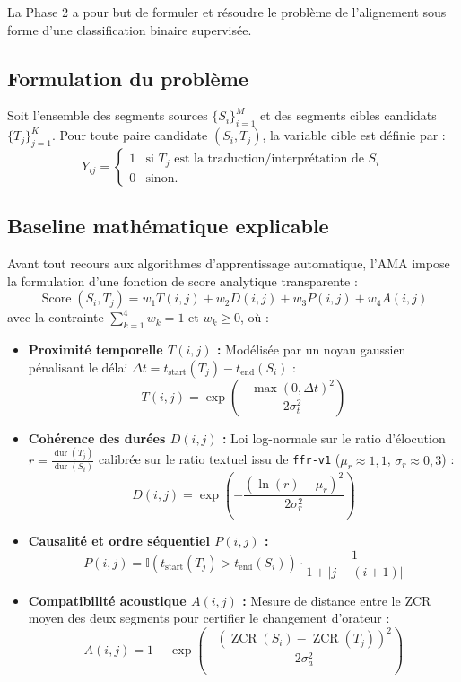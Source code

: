 \documentclass[10pt,a4paper,twocolumn]{article}
\begin{document}
La Phase 2 a pour but de formuler et résoudre le problème de l'alignement sous forme d'une classification binaire supervisée.

\subsection{Formulation du problème}
Soit l'ensemble des segments sources $\{S_i\}_{i=1}^{M}$ et des segments cibles candidats $\{T_j\}_{j=1}^{K}$. Pour toute paire candidate $(S_i, T_j)$, la variable cible est définie par :
\begin{equation}
Y_{ij} = \begin{cases} 
1 & \text{si } T_j \text{ est la traduction/interprétation de } S_i \\
0 & \text{sinon.}
\end{cases}
\end{equation}

\subsection{Baseline mathématique explicable}
Avant tout recours aux algorithmes d'apprentissage automatique, l'AMA impose la formulation d'une fonction de score analytique transparente :
\begin{equation}
\operatorname{Score}(S_i, T_j) = w_1 T(i, j) + w_2 D(i, j) + w_3 P(i, j) + w_4 A(i, j)
\end{equation}
avec la contrainte $\sum_{k=1}^4 w_k = 1$ et $w_k \ge 0$, où :
\begin{itemize}
    \item \textbf{Proximité temporelle $T(i, j)$ :} Modélisée par un noyau gaussien pénalisant le délai $\Delta t = t_{\text{start}}(T_j) - t_{\text{end}}(S_i)$ :
    \begin{equation}
    T(i, j) = \exp\left( - \frac{\max(0, \Delta t)^2}{2 \sigma_t^2} \right)
    \end{equation}
    \item \textbf{Cohérence des durées $D(i, j)$ :} Loi log-normale sur le ratio d'élocution $r = \frac{\operatorname{dur}(T_j)}{\operatorname{dur}(S_i)}$ calibrée sur le ratio textuel issu de \texttt{ffr-v1} ($\mu_r \approx 1{,}1$, $\sigma_r \approx 0{,}3$) :
    \begin{equation}
    D(i, j) = \exp\left( - \frac{(\ln(r) - \mu_r)^2}{2 \sigma_r^2} \right)
    \end{equation}
    \item \textbf{Causalité et ordre séquentiel $P(i, j)$ :}
    \begin{equation}
    P(i, j) = \mathbb{I}(t_{\text{start}}(T_j) > t_{\text{end}}(S_i)) \cdot \frac{1}{1 + |j - (i + 1)|}
    \end{equation}
    \item \textbf{Compatibilité acoustique $A(i, j)$ :} Mesure de distance entre le ZCR moyen des deux segments pour certifier le changement d'orateur :
    \begin{equation}
    A(i, j) = 1 - \exp\left( - \frac{(\operatorname{ZCR}(S_i) - \operatorname{ZCR}(T_j))^2}{2 \sigma_a^2} \right)
    \end{equation}
\end{itemize}
\end{document}
